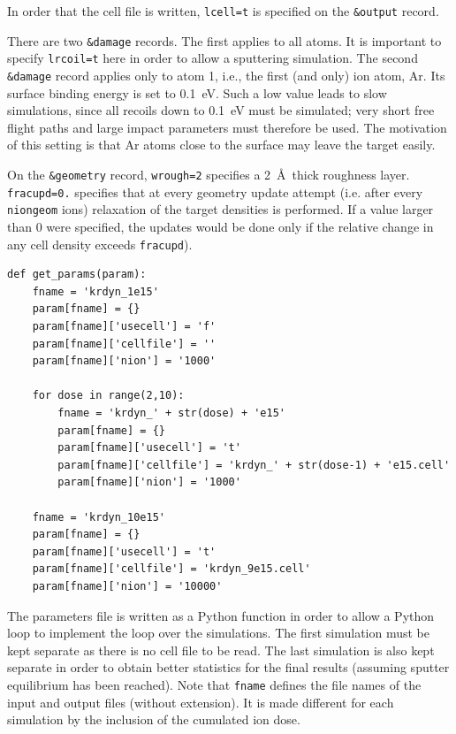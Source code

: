 In order that the cell file is written, \texttt{lcell=t} is specified on the
\texttt{\&output} record.

There are two \texttt{\&damage} records. The first applies to all atoms. It is
important to specify \texttt{lrcoil=t} here in order to allow a sputtering
simulation. The second \texttt{\&damage} record applies only to atom 1, i.e.,
the first (and only) ion atom, Ar. Its surface binding energy is set to
0.1~eV. Such a low value leads to slow simulations, since all recoils down to
0.1~eV must be simulated; very short free flight paths and large impact
parameters must therefore be used. The motivation of this setting is that Ar
atoms close to the surface may leave the target easily.

On the \texttt{\&geometry} record, \texttt{wrough=2} specifies a 2~\AA\ thick
roughness layer. \texttt{fracupd=0.} specifies that at every geometry
update attempt (i.e. after every \texttt{niongeom} ions) relaxation
of the target densities is performed. If a value larger than 0 were specified,
the updates would be done only if the relative change in any cell density
exceeds \texttt{fracupd}).

\begin{verbatim}
def get_params(param):
    fname = 'krdyn_1e15'
    param[fname] = {}
    param[fname]['usecell'] = 'f'
    param[fname]['cellfile'] = ''
    param[fname]['nion'] = '1000'
    
    for dose in range(2,10):
        fname = 'krdyn_' + str(dose) + 'e15'
        param[fname] = {}
        param[fname]['usecell'] = 't'
        param[fname]['cellfile'] = 'krdyn_' + str(dose-1) + 'e15.cell'
        param[fname]['nion'] = '1000'
    
    fname = 'krdyn_10e15'
    param[fname] = {}
    param[fname]['usecell'] = 't'
    param[fname]['cellfile'] = 'krdyn_9e15.cell'
    param[fname]['nion'] = '10000'
\end{verbatim}

The parameters file is written as a Python function in order to allow a Python
loop to implement the loop over the simulations. The first simulation must be
kept separate as there is no cell file to be read. The last simulation is also
kept separate in order to obtain better statistics for the final results
(assuming sputter equilibrium has been reached). Note that \texttt{fname}
defines the file names of the input and output files (without extension). It is
made different for each simulation by the inclusion of the cumulated ion dose.
